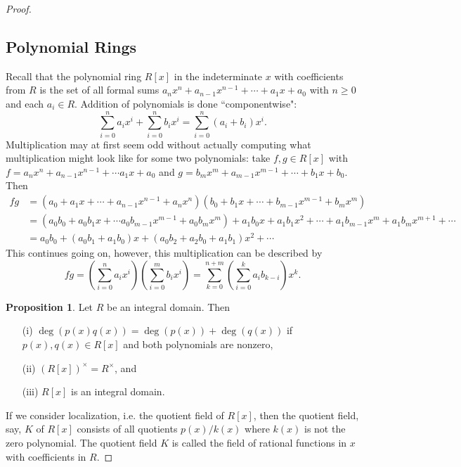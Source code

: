 \documentclass[9pt,reqno]{amsart}
\theoremstyle{definition}
\newtheorem{prop}{Proposition}[section]
\begin{document}
\begin{proof}
\subsection{Polynomial Rings}

Recall that the polynomial ring $R[x]$ in the indeterminate $x$ with coefficients from $R$ is the set of all formal sums $a_n x^n + a_{n-1} x^{n-1} + \cdots + a_1 x + a_0$ with $n \geq 0$ and each $a_i \in R$. Addition of polynomials is done ``componentwise": $$\sum_{i=0}^n a_i x^i +\sum_{i=0}^n b_i x^i = \sum_{i = 0}^n (a_i + b_i)x^i. $$
Multiplication may at first seem odd without actually computing what multiplication might look like for some two polynomials: take $f, g \in R[x]$ with $f = a_n x^n + a_{n-1}x^{n-1} + \cdots a_1 x +a_0$ and $g = b_m x^m + a_{m-1} x^{m-1} + \cdots + b_1 x + b_0$. Then 
\begin{align}
	f g &= (a_0 + a_1 x + \cdots +a_{n-1} x^{n-1} + a_n x^n )  (b_0 + b_1 x +\cdots + b_{m-1} x^{m-1} + b_mx^m) \\
	&= (a_0b_0 + a_0 b_1 x + \cdots a_0 b_{m-1} x^{m-1} + a_0 b_m x^m )+ a_1 b_0 x + a_1 b_1 x^2 + \cdots + a_1 b_{m-1} x^m + a_1 b_m x^{m+1} + \cdots  \\ 
	&= a_0 b_0 + (a_0 b_1 + a_1 b_0 )x + (a_0b_2 + a_2 b_0 + a_1 b_1) x^2 + \cdots
\end{align}
This continues going on, however, this multiplication can be described by 
$$fg = \left (\sum_{i= 0}^n a_i x^i \right) \left ( \sum_{i=0}^m b_i x^i \right) = \sum_{k=0}^{n+m} \left (\sum_{i=0}^k a_i b_{k-i} \right) x^k.$$


\begin{prop}
	Let $R$ be an integral domain. Then 
	\begin{itemize}
		\item[(i)] $\deg (p(x) q(x)) = \deg (p(x)) + \deg (q(x)) $ if $p(x), q(x) \in R[x]$ and both polynomials are nonzero, 
		\item[(ii)] $(R[x])^\times = R^\times$, and 
		\item[(iii)] $R[x]$ is an integral domain.
	\end{itemize}
\end{prop}

If we consider localization, i.e. the quotient field of $R[x]$, then the quotient field, say, $K$ of $R[x]$ consists of all quotients $p(x)/k(x)$ where $k(x)$ is not the zero polynomial. The quotient field $K$ is called the field of rational functions in $x$ with coefficients in $R$. 


\end{proof}
\end{document}
